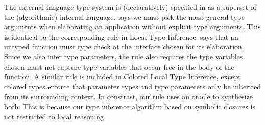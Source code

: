 The external language type system is (declaratively) specified in
as a superset of the (algorithmic) internal language.
\ltiEAppInf says we must pick the most general type arguments when elaborating
an application without explicit type arguments.
This is identical to the corresponding rule in Local Type Inference.
\ltiEUAbs says that an untyped function must type check at the interface
chosen for its elaboration.
Since we also infer type parameters, the rule also requires the type variables chosen must
not capture type variables that occur free in the body of the function.
A similar rule is included in Colored Local Type Inference, except
colored types enforce that parameter types and type parameters only be inherited
from its surrounding context.
In constrast, our rule uses an oracle to synthesize both.
This is because our type inference algorithm based on symbolic closures
is not restricted to local reasoning.

